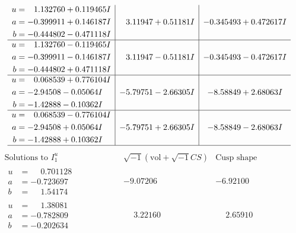 \documentclass[1p]{elsarticle_modified}
\theoremstyle{definition}
\newcommand{\I}{\sqrt{-1}}
\begin{document}
$$\begin{array}{c|c|c}
\begin{aligned}
u &= \phantom{-}1.132760 + 0.119465 I \\
a &= -0.399911 + 0.146187 I \\
b &= -0.444802 - 0.471118 I\end{aligned}
 & \phantom{-}3.11947 + 0.51181 I & -0.345493 + 0.472617 I \\ \hline\begin{aligned}
u &= \phantom{-}1.132760 - 0.119465 I \\
a &= -0.399911 - 0.146187 I \\
b &= -0.444802 + 0.471118 I\end{aligned}
 & \phantom{-}3.11947 - 0.51181 I & -0.345493 - 0.472617 I \\ \hline\begin{aligned}
u &= \phantom{-}0.068539 + 0.776104 I \\
a &= -2.94508 - 0.05064 I \\
b &= -1.42888 - 0.10362 I\end{aligned}
 & -5.79751 - 2.66305 I & -8.58849 + 2.68063 I \\ \hline\begin{aligned}
u &= \phantom{-}0.068539 - 0.776104 I \\
a &= -2.94508 + 0.05064 I \\
b &= -1.42888 + 0.10362 I\end{aligned}
 & -5.79751 + 2.66305 I & -8.58849 - 2.68063 I\\
 \hline 
 \end{array}$$\newpage$$\begin{array}{c|c|c}  
\text{Solutions to }I^u_{1}& \I (\text{vol} + \sqrt{-1}CS) & \text{Cusp shape}\\
 \hline 
\begin{aligned}
u &= \phantom{-}0.701128\phantom{ +0.000000I} \\
a &= -0.723697\phantom{ +0.000000I} \\
b &= \phantom{-}1.54174\phantom{ +0.000000I}\end{aligned}
 & -9.07206\phantom{ +0.000000I} & -6.92100\phantom{ +0.000000I} \\ \hline\begin{aligned}
u &= \phantom{-}1.38081\phantom{ +0.000000I} \\
a &= -0.782809\phantom{ +0.000000I} \\
b &= -0.202634\phantom{ +0.000000I}\end{aligned}
 & \phantom{-}3.22160\phantom{ +0.000000I} & \phantom{-}2.65910\phantom{ +0.000000I} \\ \hline\begin{aligned}

\end{aligned}
\end{array}$$
\end{document}
